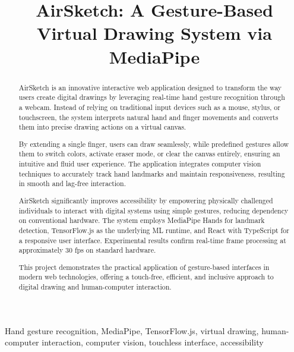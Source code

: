\documentclass[conference]{IEEEtran}
\begin{document}
\title{AirSketch: A Gesture-Based Virtual Drawing System via MediaPipe}

\author{

}

\maketitle

\begin{abstract}
AirSketch is an innovative interactive web application designed to transform the way users create digital drawings by leveraging real-time hand gesture recognition through a webcam. Instead of relying on traditional input devices such as a mouse, stylus, or touchscreen, the system interprets natural hand and finger movements and converts them into precise drawing actions on a virtual canvas.

By extending a single finger, users can draw seamlessly, while predefined gestures allow them to switch colors, activate eraser mode, or clear the canvas entirely, ensuring an intuitive and fluid user experience. The application integrates computer vision techniques to accurately track hand landmarks and maintain responsiveness, resulting in smooth and lag-free interaction.

AirSketch significantly improves accessibility by empowering physically challenged individuals to interact with digital systems using simple gestures, reducing dependency on conventional hardware. The system employs MediaPipe Hands for landmark detection, TensorFlow.js as the underlying ML runtime, and React with TypeScript for a responsive user interface. Experimental results confirm real-time frame processing at approximately 30 fps on standard hardware.

This project demonstrates the practical application of gesture-based interfaces in modern web technologies, offering a touch-free, efficient, and inclusive approach to digital drawing and human-computer interaction.
\end{abstract}

\begin{IEEEkeywords}
Hand gesture recognition, MediaPipe, TensorFlow.js, virtual drawing, human-computer interaction, computer vision, touchless interface, accessibility
\end{IEEEkeywords}
\end{document}
